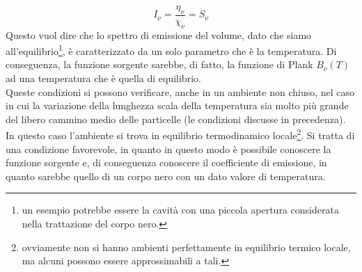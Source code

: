 \documentclass[a4paper,11pt]{article}
\begin{document}
\[I_\nu=\frac{\eta_\nu}{\chi_\nu}=S_\nu\]
Questo vuol dire che lo spettro di emissione del volume, dato che siamo all'equilibrio\footnote{un esempio potrebbe essere la cavità con una piccola apertura considerata nella trattazione del corpo nero.}, è caratterizzato da un solo parametro che è la temperatura. Di conseguenza, la funzione sorgente sarebbe, di fatto, la funzione di Plank \(B_\nu (T)\) ad una temperatura che è quella di equilibrio. \\
Queste condizioni si possono verificare, anche in un ambiente non chiuso, nel caso in cui la variazione della lunghezza scala della temperatura sia molto più grande del libero cammino medio delle particelle (le condizioni discusse in precedenza). In questo caso l'ambiente si trova in equilibrio termodinamico locale\footnote{ovviamente non si hanno ambienti perfettamente in equilibrio termico locale, ma alcuni possono essere approssimabili a tali.}. Si tratta di una condizione favorevole, in quanto in questo modo è possibile conoscere la funzione sorgente e, di conseguenza conoscere il coefficiente di emissione, in quanto sarebbe quello di un corpo nero con un dato valore di temperatura. 
\newpage
\end{document}
